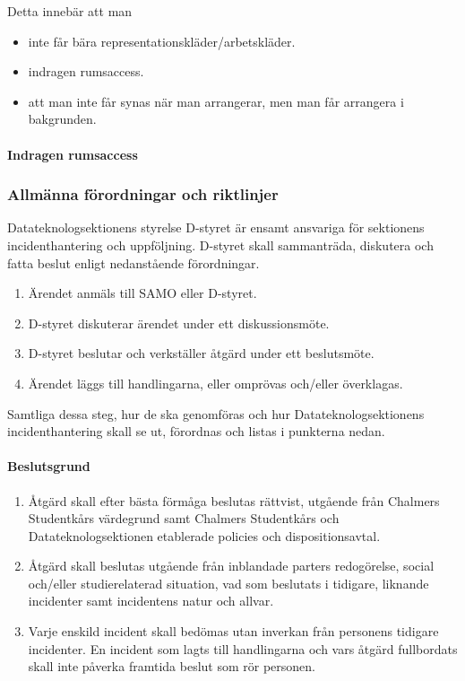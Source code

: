 \documentclass{dtek}
\begin{document}
Detta innebär att man 
\begin{itemize}
    \item inte får bära representationskläder/arbetskläder.
    \item indragen rumsaccess.
    \item att man inte får synas när man arrangerar, men man får arrangera i bakgrunden.
\end{itemize}

\paragraph{Indragen rumsaccess}


\subsubsection{Allmänna förordningar och riktlinjer}
Datateknologsektionens styrelse D-styret är ensamt ansvariga för sektionens
incidenthantering och uppföljning. D-styret skall sammanträda, diskutera och
fatta beslut enligt nedanstående förordningar.

\begin{enumerate}
  \item Ärendet anmäls till SAMO eller D-styret.
  \item D-styret diskuterar ärendet under ett diskussionsmöte.
  \item D-styret beslutar och verkställer åtgärd under ett beslutsmöte.
  \item Ärendet läggs till handlingarna, eller omprövas och/eller överklagas.
\end{enumerate}

Samtliga dessa steg, hur de ska genomföras och hur Datateknologsektionens
incidenthantering skall se ut, förordnas och listas i punkterna nedan.

\paragraph{Beslutsgrund}
\begin{enumerate}
  \item Åtgärd skall efter bästa förmåga beslutas rättvist, utgående från Chalmers Studentkårs värdegrund samt Chalmers Studentkårs och Datateknologsektionen etablerade policies och dispositionsavtal.
  \item Åtgärd skall beslutas utgående från inblandade parters redogörelse, social och/eller studierelaterad situation, vad som beslutats i tidigare, liknande incidenter samt incidentens natur och allvar.
  \item Varje enskild incident skall bedömas utan inverkan från personens tidigare incidenter. En incident som lagts till handlingarna och vars åtgärd fullbordats skall inte påverka framtida beslut som rör personen.
\end{enumerate}
\end{document}
